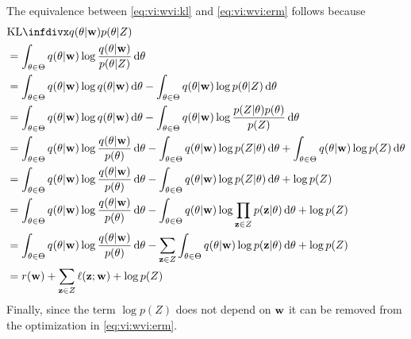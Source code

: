 \documentclass[thesis.tex]{subfiles}
\begin{document}
The equivalence between \eqref{eq:vi:wvi:kl} and \eqref{eq:vi:wvi:erm} follows because 
\begin{align}
    &\kl{q(\theta|\w)}{p(\theta|Z)}
    \\&=
    \int_{\theta\in\Theta} q(\theta|\w)\log\frac{q(\theta|\w)}{p(\theta|Z)} \dd\theta
    \\&=
    \int_{\theta\in\Theta} q(\theta|\w)\log q(\theta|\w)\dd\theta 
   -\int_{\theta\in\Theta} q(\theta|\w)\log p(\theta|Z) \dd\theta
    \\&=
    \int_{\theta\in\Theta} q(\theta|\w)\log q(\theta|\w)\dd\theta 
   -\int_{\theta\in\Theta} q(\theta|\w)\log \frac{p(Z|\theta)p(\theta)}{p(Z)} \dd\theta
    \\&=
    \int_{\theta\in\Theta} q(\theta|\w)\log \frac{q(\theta|\w)}{p(\theta)}\dd\theta 
   -\int_{\theta\in\Theta} q(\theta|\w)\log p(Z|\theta) \dd\theta
   +\int_{\theta\in\Theta} q(\theta|\w)\log p(Z) \dd\theta
    \\&=
    \int_{\theta\in\Theta} q(\theta|\w)\log \frac{q(\theta|\w)}{p(\theta)}\dd\theta 
   -\int_{\theta\in\Theta} q(\theta|\w)\log p(Z|\theta) \dd\theta
   +\log p(Z)
    \\&=
    \int_{\theta\in\Theta} q(\theta|\w)\log \frac{q(\theta|\w)}{p(\theta)}\dd\theta 
   -\int_{\theta\in\Theta} q(\theta|\w)\log \prod_{\z\in Z}p(\z|\theta) \dd\theta
   +\log p(Z)
    \\&=
    \int_{\theta\in\Theta} q(\theta|\w)\log \frac{q(\theta|\w)}{p(\theta)}\dd\theta 
   -\sum_{\z\in Z}\int_{\theta\in\Theta} q(\theta|\w)\log p(\z|\theta) \dd\theta
   +\log p(Z)
    \\&=
    \reg(\w)
   +\sum_{\z\in Z} \loss(\z;\w)
   +\log p(Z)
\end{align}
Finally, since the term $\log p(Z)$ does not depend on $\mathbf w$ it can be removed from the optimization in \eqref{eq:vi:wvi:erm}. 
\end{document}
